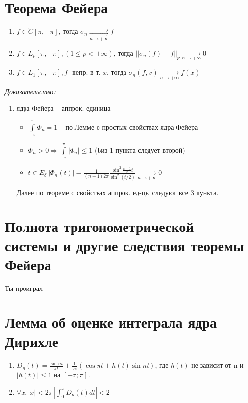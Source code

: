 \documentclass[paper=a4, fontsize=14pt]{report}
\begin{document}
    \section{Теорема Фейера}
        \begin{enumerate}
            \item $ f \in \widetilde{C}[\pi, -\pi] $, тогда $ \sigma_n \underset{n \rightarrow +\infty}{\rightrightarrows} f$

            \item $ f \in L_p[\pi, -\pi], (1 \leq p < +\infty)$, тогда $ ||\sigma_n(f) - f||_p \underset{n \rightarrow +\infty}{\rightarrow} 0 $

            \item $ f \in L_1[\pi, -\pi], f $- непр. в т. $x$, тогда $ \sigma_n(f, x) \underset{n \rightarrow +\infty}{\rightarrow} f(x) $
        \end{enumerate}
        
        
        \emph{Доказательство:}

	\begin{enumerate}
		\item ядра Фейера -- аппрок. единица
		\begin{itemize}
			\item $ \int\limits_{-\pi}^{\pi} \Phi_n  = 1 $ -- по Лемме о простых свойствах ядра Фейера
			\item $  \Phi_n > 0 \Rightarrow \int\limits_{-\pi}^{\pi} |\Phi_n | \leq 1$ (bиз 1 пункта следует второй)
			\item $ t \in E_{\delta} ~ | \Phi_n(t)| = \frac{1}{(n+1)2\pi}\frac{\sin^2\frac{n + 1}{2}t}{\sin^2(t/2)} \underset{n \rightarrow +\infty}{\rightarrow} 0 $
		\end{itemize}

		Далее по теореме о свойствах аппрок. ед-цы следуют все 3 пункта.

\end{enumerate}

    \section{Полнота тригонометрической системы и другие следствия теоремы Фейера}
    Ты проиграл

    \section{Лемма об оценке интеграла ядра Дирихле}
    \begin{enumerate}
        \item $D_n(t) = \frac{\sin nt}{\pi t} + \frac{1}{2\pi}(\cos nt + h(t)\sin nt)$, где $h(t)$ не зависит от n и $|h(t)| \leq 1$
            на $[-\pi;\pi]$.
        \item $\forall x, |x| < 2\pi\ |\int_0^x D_n(t) dt| < 2$
    \end{enumerate}
    
\end{document}
